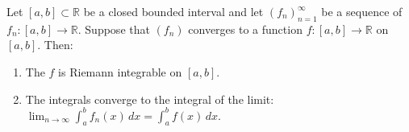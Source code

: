 \begin{theorem} \label{theorem:uniform_convergence_of_a_sequence_of_riemann_integrable_functions_on_a_closed_interval_implies_the_limit_function_is_riemann_integrable_and_its_integral_equals_the_limit_of_the_integrals}
Let $[a, b] \subset \mathbb{R}$ be a closed bounded interval and let $(f_n)_{n=1}^{\infty}$ be a sequence of  $f_n : [a, b] \to \mathbb{R}$. Suppose that $(f_n)$ converges to a function $f : [a, b] \to \mathbb{R}$  on $[a, b]$. Then:
\begin{enumerate}
  \item The  $f$ is Riemann integrable on $[a, b]$.
  \item The integrals converge to the integral of the limit:
  $\lim_{n \to \infty} \int_{a}^{b} f_n(x)\,dx = \int_{a}^{b} f(x)\,dx$.
\end{enumerate}
\end{theorem}

